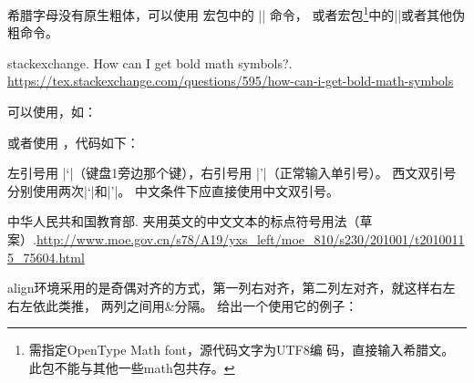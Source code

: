 
希腊字母没有原生粗体，可以使用 宏包中的 |\bm| 命令，
或者宏包\footnote{需指定OpenType Math font，源代码文字为UTF8编
  码，直接输入希腊文。此包不能与其他一些math包共存。}中的|\symbf|或者其他伪粗命令。
\begin{reference}
  \item stackexchange. How can I get bold math symbols?. \url{https://tex.stackexchange.com/questions/595/how-can-i-get-bold-math-symbols}
\end{reference}


可以使用，如：


或者使用 ，代码如下：

 

左引号用 |`|（键盘1旁边那个键），右引号用 |'|（正常输入单引号）。
西文双引号分别使用两次|`|和|'|。
中文条件下应直接使用中文双引号。
\begin{reference}
  \item 中华人民共和国教育部. 夹用英文的中文文本的标点符号用法（草案）.\url{http://www.moe.gov.cn/s78/A19/yxs_left/moe_810/s230/201001/t20100115_75604.html}
\end{reference}


align环境采用的是奇偶对齐的方式，第一列右对齐，第二列左对齐，就这样右左右左依此类推，
两列之间用\&分隔。
给出一个使用它的例子：

